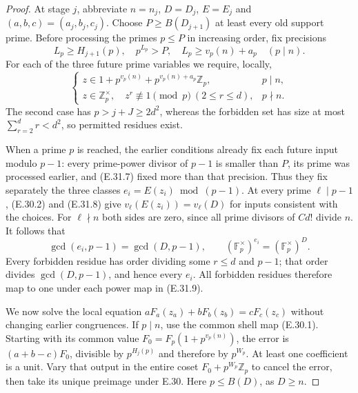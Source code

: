 \begin{proof}
At stage $j$, abbreviate $n=n_j$, $D=D_j$, $E=E_j$ and
$(a,b,c)=(a_j,b_j,c_j)$.  Choose $P\ge B(D_{j+1})$ at least every
old support prime.  Before processing the primes $p\le P$ in increasing
order, fix precisions
\[
 L_p\ge H_{j+1}(p),\quad p^{L_p}>P,\quad
 L_p\ge v_p(n)+a_p\quad(p\mid n).
 \tag{E.31.7}
\]
For each of the three future prime variables we require, locally,
\[
 \begin{cases}
 z\in1+p^{v_p(n)}+p^{v_p(n)+a_p}\mathbb Z_p,&p\mid n,\\
 z\in\mathbb Z_p^\times,\quad z^r\not\equiv1\pmod p
                         \ (2\le r\le d),&p\nmid n.
 \end{cases}
 \tag{E.31.8}
\]
The second case has $p>j+J\ge2d^2$, whereas the forbidden set has
size at most $\sum_{r=2}^dr<d^2$, so permitted residues exist.

When a prime $p$ is reached, the earlier conditions already fix each
future input modulo $p-1$: every prime-power divisor of $p-1$ is
smaller than $P$, its prime was processed earlier, and (E.31.7) fixed
more than that precision.  Thus they fix separately the three classes
$e_i=E(z_i)\bmod(p-1)$.  At every prime $\ell\mid p-1$,
(E.30.2) and (E.31.8) give
$v_\ell(E(z_i))=v_\ell(D)$ for inputs consistent with the choices.
For $\ell\nmid n$ both sides are zero, since all prime divisors of
$C d!$ divide $n$.  It follows that
\[
 \gcd(e_i,p-1)=\gcd(D,p-1),\qquad
 (\mathbb F_p^\times)^{e_i}=(\mathbb F_p^\times)^D.
 \tag{E.31.9}
\]
Every forbidden residue has order dividing some $r\le d$ and $p-1$;
that order divides $\gcd(D,p-1)$, and hence every $e_i$.  All forbidden
residues therefore map to one under each power map in (E.31.9).

We now solve the local equation
$aF_a(z_a)+bF_b(z_b)=cF_c(z_c)$ without changing earlier congruences.
If $p\mid n$, use the common shell map (E.30.1).  Starting with its
common value $F_0=F_p(1+p^{v_p(n)})$, the error is
$(a+b-c)F_0$, divisible by $p^{H_j(p)}$ and therefore by $p^{W_p}$.
At least one coefficient is a unit.  Vary that output in the entire
coset $F_0+p^{W_p}\mathbb Z_p$ to cancel the error, then take its
unique preimage under E.30.  Here $p\le B(D)$, as $D\ge n$.


\end{proof}
